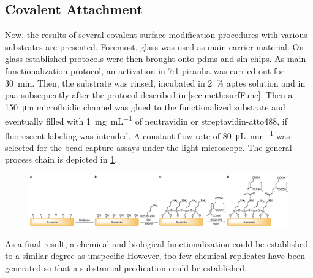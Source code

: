 \subsection{Covalent Attachment}
Now, the results of several covalent surface modification procedures with various substrates are presented. Foremost, glass was used as main carrier material. On glass established protocols were then brought onto \gls{pdms} and \gls{sin} chips. As main functionalization protocol, an activation in 7:1 \gls{piranha} was carried out for \SI{30}{\minute}. Then, the substrate was rinsed, incubated in \SI{2}{\percent} \gls{aptes} solution and in \gls{paa} subsequently after the protocol described in \cref{sec:meth:surfFunc}. Then a \SI{150}{\micro\meter} microfluidic channel was glued to the functionalized substrate and eventually filled with \SI{1}{\milli\gram\per\milli\liter} of neutravidin or streptavidin-atto488, if fluorescent labeling was intended. A constant flow rate of \SI{80}{\micro\liter\per\minute} was selected for the bead capture assays under the light microscope. The general process chain is depicted in \cref{fig:chem:func:withPAA}.
\begin{figure}[h!]
	\centering
	\includegraphics[width=1\linewidth]{Ressources/Chemistry/Substrate}
	\label{fig:chem:func:withPAA}
\end{figure}

As a final result, a chemical and biological functionalization could be established to a similar degree as unspecific
However, too few chemical replicates have been generated so that a substantial predication could be established. 


